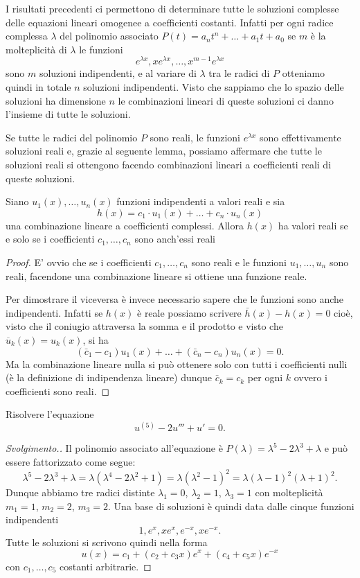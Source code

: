 I risultati precedenti ci permettono di determinare tutte le soluzioni complesse delle equazioni 
lineari omogenee a coefficienti costanti. Infatti per ogni radice complessa $\lambda$ del polinomio 
associato $P(t) = a_n t^n + \dots + a_1 t + a_0$ se $m$ è la molteplicità di $\lambda$ 
le funzioni 
\[
  e^{\lambda x}, x e^{\lambda x}, \dots, x^{m-1} e^{\lambda x}  
\]
sono $m$ soluzioni indipendenti, e al variare di $\lambda$ tra le radici di $P$ otteniamo 
quindi in totale $n$ soluzioni indipendenti. Visto che 
sappiamo che lo spazio delle soluzioni ha dimensione $n$ le combinazioni lineari di queste 
soluzioni ci danno l'insieme di tutte le soluzioni.

Se tutte le radici del polinomio $P$ sono reali, le funzioni $e^{\lambda x}$ sono effettivamente 
soluzioni reali e, grazie al seguente lemma, possiamo affermare che tutte le soluzioni reali 
si ottengono facendo combinazioni lineari a coefficienti reali di queste soluzioni.

\begin{lemma}\label{lm:combinazioni_reali}
Siano $u_1(x), \dots, u_n(x)$ funzioni indipendenti a valori reali
e sia 
\[
  h(x) = c_1 \cdot u_1(x) + \dots + c_n \cdot u_n(x)
\]
una combinazione lineare a coefficienti complessi.
Allora $h(x)$ ha valori reali se e solo se i coefficienti $c_1, \dots, c_n$ 
sono anch'essi reali
\end{lemma}
%
\begin{proof}
E' ovvio che se i coefficienti $c_1,\dots,c_n$ sono reali e le funzioni $u_1, \dots, u_n$ sono reali,
facendone una combinazione lineare si ottiene una funzione reale.

Per dimostrare il viceversa è invece necessario sapere che le funzioni sono anche indipendenti. Infatti 
se $h(x)$ è reale possiamo scrivere $\bar h(x) - h(x) = 0$ cioè, visto che il coniugio
attraversa la somma e il prodotto e visto che $\overline u_k(x) = u_k(x)$, si ha 
\[
 (\bar c_1 - c_1) u_1(x) + \dots + (\bar c_n-c_n) u_n(x)=0.
\]
Ma la combinazione lineare nulla si può ottenere solo con tutti i coefficienti nulli 
(è la definizione di indipendenza lineare) dunque $\bar c_k = c_k$ per ogni $k$ ovvero 
i coefficienti sono reali.
\end{proof}

\begin{example}
Risolvere l'equazione
\[
  u^{(5)} - 2 u''' + u' = 0.  
\]
\end{example}
%
\begin{proof}[Svolgimento.]
Il polinomio associato all'equazione è $P(\lambda) = \lambda^5 - 2\lambda^3 + \lambda$ 
e può essere fattorizzato come segue:
\[
  \lambda^5 - 2\lambda^3 + \lambda
  = \lambda(\lambda^4-2\lambda^2+1)
  = \lambda(\lambda^2-1)^2
  = \lambda(\lambda-1)^2(\lambda+1)^2.
\]
Dunque abbiamo tre radici distinte $\lambda_1=0$, $\lambda_2=1$, $\lambda_3=1$ con molteplicità 
$m_1=1$, $m_2=2$, $m_3=2$.
Una base di soluzioni è quindi data dalle cinque funzioni indipendenti
\[
 1, e^x, xe^x, e^{-x}, xe^{-x}.
\]
Tutte le soluzioni si scrivono quindi nella forma
\[
  u(x) = c_1 + (c_2 + c_3 x)e^x + (c_4 + c_5 x) e^{-x}  
\]
con $c_1, \dots, c_5$ costanti arbitrarie.
\end{proof}

